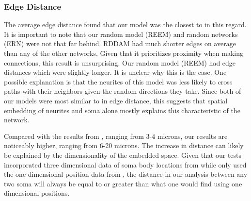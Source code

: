 \subsubsection{Edge Distance} 
The average edge distance found that our model was the closest to \ce in this regard. 
It is important to note that our random model (REEM) and random networks (ERN) were not that far behind. 
RDDAM had much shorter edges on average than any of the other networks. 
Given that it prioritizes proximity when making connections, this result is unsurprising. 
Our random model (REEM) had edge distances which were slightly longer. 
It is unclear why this is the case. 
One possible explanation is that the neurites of this model was less likely to cross paths with their neighbors given the random directions they take.
Since both of our models were most similar to \ce in edge distance, this suggests that spatial embedding of neurites and soma alone mostly explains this characteristic of the network. 

Compared with the results from \cite{Itzhack}, ranging from 3-4 microns, our results are noticeably higher, ranging from 6-20 microns. 
The increase in distance can likely be explained by the dimensionality of the embedded space. 
Given that our tests incorporated three dimensional data of soma body locations from \cite{Skuhersky} while \cite{Itzhack} only used the one dimensional position data from \cite{WormAtlas2009}, the distance in our analysis between any two soma will always be equal to or greater than what one would find using one dimensional positions.

